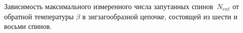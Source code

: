 Зависимость максимального измеренного числа запутанных спинов~$N_{ent}$ от обратной температуры $\beta$
в зигзагообразной цепочке,
состоящей из шести и восьми спинов.